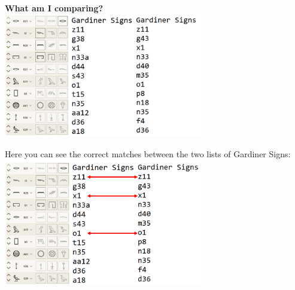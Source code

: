\documentclass[unknownkeysallowed,usepdftitle=false, parskip=full, aspectratio=169]{beamer}
\newcommand{\secvariable}{nothing}
\begin{document}
\begin{frame}\label{\secvariable}

\begin{center}
\textbf{What am I comparing?}
\\ \includegraphics[width=0.65\textwidth,keepaspectratio]{figure/GardinerCodes.PNG}
\end{center}

\end{frame}



\begin{frame}\label{\secvariable}

\begin{center}
Here you can see the correct matches between the two lists of Gardiner Signs:
\includegraphics[width=0.65\textwidth,keepaspectratio]{figure/matches.PNG}
\end{center}

\end{frame}


\end{document}
